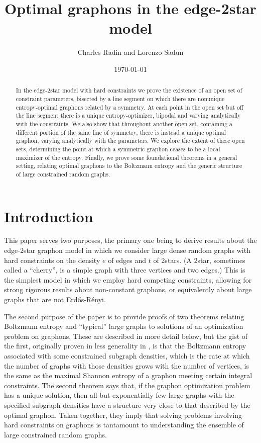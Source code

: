 \documentclass[12pt]{amsart}
\title{Optimal graphons in the edge-2star model}
\author{Charles Radin and Lorenzo Sadun}
\date{\today}
\newcommand{\ER}{Erd\H{o}s-R\'enyi}
\newcommand{\1}{\mathbf{1}}
\begin{document}
\begin{abstract}
  In the edge-2star model with hard constraints we prove the existence
  of an open set of constraint parameters, bisected by a
  line segment on which there are nonunique entropy-optimal graphons
  related by a
  symmetry. At each point in the open set but off the line segment there is a unique
  entropy-optimizer, bipodal and varying analytically with the constraints. 
  We also show that throughout another open set, containing a different portion
  of the same line of symmetry, there is instead a unique optimal
  graphon, varying analytically with the parameters. 
  We explore the extent
  of these open sets, determining the point at which a symmetric graphon ceases to be
  a local maximizer of the entropy. Finally, we prove some foundational theorems in 
  a general setting, relating optimal graphons to the Boltzmann entropy and the 
  generic structure of large constrained random graphs. 
 \end{abstract}
\maketitle

\section{Introduction}

This paper serves two purposes, the primary one being
to derive results about the edge-2star graphon
model in which we consider large dense random graphs 
with hard constraints
on the density $e$ of edges and $t$ of 2stars. (A 2star, sometimes called a 
``cherry'', is a simple graph with three vertices and two edges.) This is the 
simplest model
in which we employ hard competing constraints, allowing for strong 
rigorous results about non-constant graphons, or equivalently about large graphs that
are not \ER{}. 

The second purpose of the paper is to provide proofs of two theorems relating Boltzmann
entropy and ``typical'' large graphs to solutions of an optimization problem on 
graphons. These are described in more detail below, but the gist of
the first, originally proven in less generality in \cite{RS1,RS2}, is that
the Boltzmann entropy associated with some constrained subgraph densities, which is 
the rate at which the number of graphs with those densities grows with the number 
of vertices, is the same as the maximal Shannon entropy of a graphon meeting certain
integral constraints. The second theorem says that, if the graphon optimization problem
has a unique solution, then all but exponentially few large graphs with the 
specified subgraph densities have a structure very close to that 
described by the optimal graphon. Taken together, they imply that solving problems 
involving hard constraints on graph{ons} is tantamount to understanding 
the ensemble of  large constrained random {graphs}.
\end{document}

